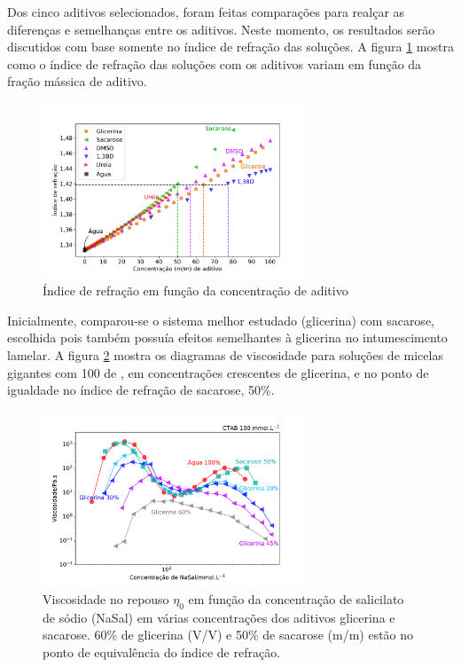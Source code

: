 			Dos cinco aditivos selecionados, foram feitas comparações para realçar as diferenças e semelhanças entre os aditivos. Neste momento, os resultados serão discutidos com base somente no índice de refração das soluções. A figura \ref{fig:indice_refracao} mostra como o índice de refração das soluções com os aditivos variam em função da fração mássica de aditivo.
					
			\begin{figure}[h]
				\centering
				\includegraphics[width=0.7\textwidth]{imagens/propriedades/indice_refracao}
				\caption{Índice de refração em função da concentração de aditivo}
				\label{fig:indice_refracao}
			\end{figure}
	
			Inicialmente, comparou-se o sistema melhor estudado (glicerina) com sacarose, escolhida pois também possuía efeitos semelhantes à glicerina no intumescimento lamelar. A figura \ref{fig:rh_sacarose_glicerina} mostra os diagramas de viscosidade para soluções de micelas gigantes com 100 \mM{} de \CTAB, em concentrações crescentes de glicerina, e no ponto de igualdade no índice de refração de sacarose, 50\%.
			
			\begin{figure}[h]
				\centering
				\includegraphics[width=0.7\textwidth]{imagens/reologia/RH_sacarose_glicerina}
				\caption{Viscosidade no repouso \(\eta_0\) em função da concentração de salicilato de sódio (NaSal) em várias concentrações dos aditivos glicerina e sacarose. 60\% de glicerina (V/V) e 50\% de sacarose (m/m) estão no ponto de equivalência do índice de refração.}
				\label{fig:rh_sacarose_glicerina}
			\end{figure} %
			

